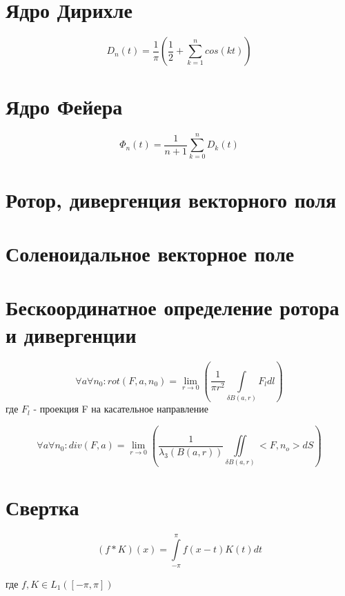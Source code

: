 \documentclass[paper=a4, fontsize=17pt]{article}
\begin{document}
	\section{Ядро Дирихле}
	
	$$ D_n(t) = \frac{1}{\pi}( \frac{1}{2} + \sum_{k = 1}^{n} cos(kt)) $$
	
	\section{Ядро Фейера} 
	
	$$ \Phi_n(t) = \frac{1}{n+1} \sum_{k = 0}^{n} D_k(t) $$
	
	\section{Ротор, дивергенция векторного поля}
	
	\section{Соленоидальное векторное поле}
	
	\section{Бескоординатное определение ротора и дивергенции}
	$$ \forall a \forall n_0 : rot(F, a, n_0) = \lim\limits_{r \rightarrow 0} \left( \frac{1}{\pi r^2} \int\limits_{\delta B(a, r)}F_l dl \right)$$
	 где $F_l$ - проекция F на касательное направление
	
	$$ \forall a \forall n_0 : div(F, a) = \lim\limits_{r \rightarrow 0} \left( \frac{1}{\lambda_3(B(a, r))}  \iint\limits_{\delta B(a, r)}<F, n_o>dS \right)$$
	\section{Свертка}
	
	$$ (f \ast K)(x) = \int\limits_{-\pi}^{\pi} f(x-t)K(t) dt$$ 
	
	где $ f, K \in L_1([-\pi, \pi]) $
\end{document}
